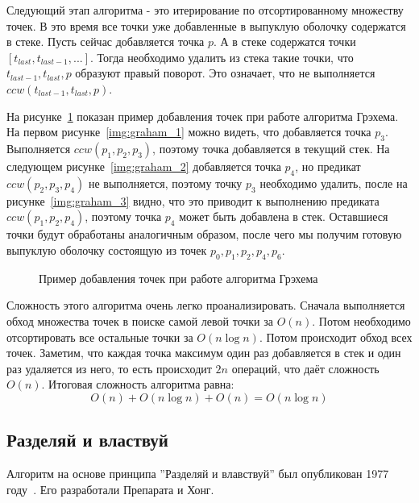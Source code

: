 Следующий этап алгоритма - это итерирование по отсортированному множеству точек. В это время все точки уже добавленные в выпуклую оболочку содержатся в стеке. Пусть сейчас добавляется точка $p$. А в стеке содержатся точки $[t_{last}, t_{last-1}, ...]$. Тогда необходимо удалить из стека такие точки, что $t_{last-1}, t_{last}, p$ образуют правый поворот. Это означает, что не выполняется $ccw(t_{last-1}, t_{last}, p)$.

На рисунке~\ref{img:graham} показан пример добавления точек при работе алгоритма Грэхема. На первом рисунке~\ref{img:graham_1} можно видеть, что добавляется точка $p_3$. Выполняется $ccw(p_1, p_2, p_3)$, поэтому точка добавляется в текущий стек. На следующем рисунке~\ref{img:graham_2} добавляется точка $p_4$, но предикат $ccw(p_2, p_3, p_4)$ не выполняется, поэтому точку $p_3$ необходимо удалить, после на рисунке~\ref{img:graham_3} видно, что это приводит к выполнению предиката $ccw(p_1, p_2, p_4)$, поэтому точка $p_4$ может быть добавлена в стек. Оставшиеся точки будут обработаны аналогичным образом, после чего мы получим готовую выпуклую оболочку состоящую из точек $p_0, p_1, p_2, p_4, p_6$.

\begin{figure}[H]
	{\centering
		\hfill
		\subbottom[\label{img:graham_1}]{%
			}
		\hfill
		\subbottom[\label{img:graham_2}]{%
			}
		\hfill
		\subbottom[\label{img:graham_3}]{%
			}
		\hfill
	}
	\caption{Пример добавления точек при работе алгоритма Грэхема}
	\label{img:graham}
\end{figure}

Сложность этого алгоритма очень легко проанализировать. Сначала выполняется обход множества точек в поиске самой левой точки за $O(n)$. Потом необходимо отсортировать все остальные точки за $O(n \log n)$. Потом происходит обход всех точек. Заметим, что каждая точка максимум один раз добавляется в стек и один раз удаляется из него, то есть происходит $2n$ операций, что даёт сложность $O(n)$. Итоговая сложность алгоритма равна:
\[
O(n) + O(n \log n) + O(n) = O(n \log n)
\]

\subsection{Разделяй и властвуй} \label{subsect1_1_3}

Алгоритм на основе принципа ''Разделяй и влавствуй'' был опубликован 1977 году~\cite{preparata1977DivideAndConquer}. Его разработали Препарата и Хонг.

